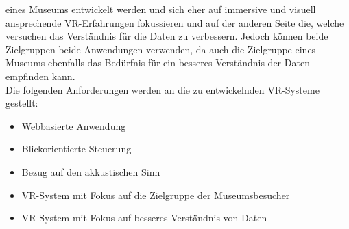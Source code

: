 \documentclass[a4paper,12pt,oneside]{article}
\begin{document}
      eines Museums entwickelt werden und sich eher auf immersive und visuell ansprechende
      VR-Erfahrungen fokussieren und auf der anderen Seite die, welche versuchen das
      Verständnis für die Daten zu verbessern. Jedoch können beide Zielgruppen beide
      Anwendungen verwenden, da auch die Zielgruppe eines Museums ebenfalls das Bedürfnis
      für ein besseres Verständnis der Daten empfinden kann.\\
      Die folgenden Anforderungen werden an die zu entwickelnden VR-Systeme gestellt:\\
      \begin{tcolorbox}[title={Die Anforderungen}]
          \begin{itemize}
          \item Webbasierte Anwendung
          \item Blickorientierte Steuerung
          \item Bezug auf den akkustischen Sinn
          \item VR-System mit Fokus auf die Zielgruppe der Museumsbesucher
          \item VR-System mit Fokus auf besseres Verständnis von Daten
        \end{itemize}
      \end{tcolorbox}
\end{document}
